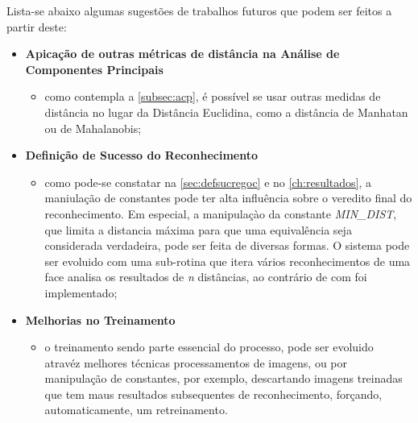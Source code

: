 Lista-se abaixo algumas sugestões de trabalhos futuros que podem ser feitos a partir deste:


\begin{itemize}	
	\item \textbf{Apicação de outras métricas de distância na Análise de Componentes Principais}
	\begin{itemize}	
		\item como contempla a \autoref{subsec:acp}, é possível se usar outras medidas de distância no lugar da Distância Euclidina, como a distância de Manhatan ou de Mahalanobis;
	\end{itemize}
	
	\item \textbf{Definição de Sucesso do Reconhecimento}
	\begin{itemize}	
		\item como pode-se constatar na \autoref{sec:defsucregoc} e no \autoref{ch:resultados}, a maniulação de constantes pode ter alta influência sobre o veredito final do reconhecimento. Em especial, a manipulaçào da constante \textit{MIN\_DIST}, que limita a distancia máxima para que uma equivalência seja considerada verdadeira, pode ser feita de diversas formas. O sistema pode ser evoluido com uma sub-rotina que itera vários reconhecimentos de uma face analisa os resultados de \textit{n} distâncias, ao contrário de com foi implementado;
	\end{itemize}
	
	\item \textbf{Melhorias no Treinamento}
	\begin{itemize}	
		\item o treinamento sendo parte essencial do processo, pode ser evoluido atravéz melhores técnicas processamentos de imagens, ou por manipulação de constantes, por exemplo, descartando imagens treinadas que tem maus resultados subsequentes de reconhecimento, forçando, automaticamente, um retreinamento.
	\end{itemize}
\end{itemize}